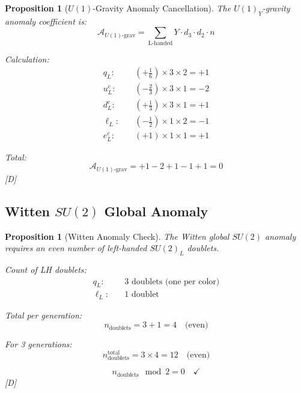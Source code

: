 \documentclass[11pt,a4paper]{article}
\newtheorem{proposition}[theorem]{Proposition}
\newcommand{\tagD}{\textcolor{blue!70!black}{[D]}}
\begin{document}
\begin{proposition}[$U(1)$-Gravity Anomaly Cancellation]
\label{prop:u1-grav-anomaly}
The $U(1)_Y$-gravity anomaly coefficient is:
\begin{equation}
\label{eq:u1-grav-def}
\mathcal{A}_{U(1)\text{-grav}} = \sum_{\text{L-handed}} Y \cdot d_3 \cdot d_2 \cdot n
\end{equation}

Calculation:
\begin{align}
\label{eq:u1-grav-qL}
q_L: \quad & (+\frac{1}{6}) \times 3 \times 2 = +1 \\
\label{eq:u1-grav-uLc}
u_L^c: \quad & (-\frac{2}{3}) \times 3 \times 1 = -2 \\
\label{eq:u1-grav-dLc}
d_L^c: \quad & (+\frac{1}{3}) \times 3 \times 1 = +1 \\
\label{eq:u1-grav-lL}
\ell_L: \quad & (-\frac{1}{2}) \times 1 \times 2 = -1 \\
\label{eq:u1-grav-eLc}
e_L^c: \quad & (+1) \times 1 \times 1 = +1
\end{align}

Total:
\begin{equation}
\label{eq:u1-grav-total}
\boxed{\mathcal{A}_{U(1)\text{-grav}} = +1 - 2 + 1 - 1 + 1 = 0}
\end{equation}
\tagD
\end{proposition}

\subsection{Witten $SU(2)$ Global Anomaly}

\begin{proposition}[Witten Anomaly Check]
\label{prop:witten-anomaly}
The Witten global $SU(2)$ anomaly requires an even number of left-handed $SU(2)_L$ doublets.

Count of LH doublets:
\begin{align}
\label{eq:witten-qL}
q_L: \quad & 3 \text{ doublets (one per color)} \\
\label{eq:witten-lL}
\ell_L: \quad & 1 \text{ doublet}
\end{align}

Total per generation:
\begin{equation}
\label{eq:witten-total-gen}
n_{\text{doublets}} = 3 + 1 = 4 \quad \text{(even)}
\end{equation}

For 3 generations:
\begin{equation}
\label{eq:witten-total-3gen}
n_{\text{doublets}}^{\text{total}} = 3 \times 4 = 12 \quad \text{(even)}
\end{equation}

\begin{equation}
\label{eq:witten-check}
\boxed{n_{\text{doublets}} \mod 2 = 0 \quad \checkmark}
\end{equation}
\tagD
\end{proposition}
\end{document}
